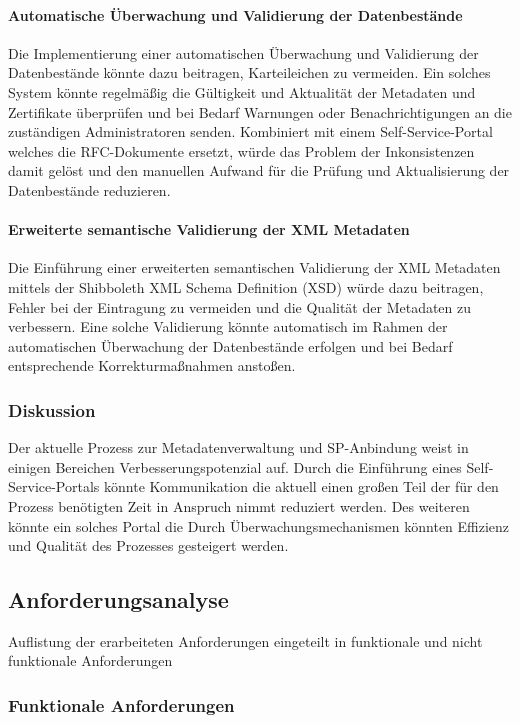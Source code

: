 \documentclass[a4paper, fontsize=11pt]{scrartcl}
\begin{document}
\paragraph{Automatische Überwachung und Validierung der Datenbestände}
Die Implementierung einer automatischen Überwachung und Validierung der Datenbestände könnte dazu beitragen, Karteileichen zu vermeiden.
Ein solches System könnte regelmäßig die Gültigkeit und Aktualität der Metadaten und Zertifikate überprüfen und bei Bedarf Warnungen oder Benachrichtigungen an die zuständigen Administratoren senden.
Kombiniert mit einem Self-Service-Portal welches die RFC-Dokumente ersetzt, würde das Problem der Inkonsistenzen damit gelöst und den manuellen Aufwand für die Prüfung und Aktualisierung der Datenbestände reduzieren.

\paragraph{Erweiterte semantische Validierung der XML Metadaten}
Die Einführung einer erweiterten semantischen Validierung der XML Metadaten mittels der Shibboleth XML Schema Definition (XSD) würde dazu beitragen, Fehler bei der Eintragung zu vermeiden und die Qualität der Metadaten zu verbessern.
Eine solche Validierung könnte automatisch im Rahmen der automatischen Überwachung der Datenbestände erfolgen und bei Bedarf entsprechende Korrekturmaßnahmen anstoßen.

\subsubsection{Diskussion}\label{subsubsec:prozessanalyse-discussion}
Der aktuelle Prozess zur Metadatenverwaltung und SP-Anbindung weist in einigen Bereichen Verbesserungspotenzial auf.
Durch die Einführung eines Self-Service-Portals könnte Kommunikation die aktuell einen großen Teil der für den Prozess benötigten Zeit in Anspruch nimmt reduziert werden.
Des weiteren könnte ein solches Portal die 
Durch Überwachungsmechanismen könnten Effizienz und Qualität des Prozesses gesteigert werden.

\subsection{Anforderungsanalyse}\label{subsec:anforderungsanalyse-results}
Auflistung der erarbeiteten Anforderungen eingeteilt in funktionale und nicht funktionale Anforderungen
\subsubsection{Funktionale Anforderungen}\label{subsubsec:functional-requirements}
\end{document}
